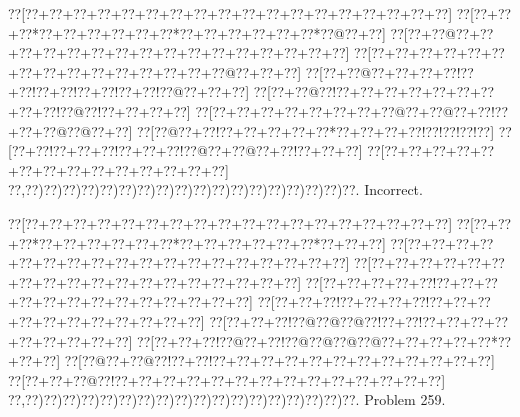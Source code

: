 \documentclass[a5paper]{article}
\begin{document}
\begin{center}
{\goo
\0??[\0??+\0??+\0??+\0??+\0??+\0??+\0??+\0??+\0??+\0??+\0??+\0??+\0??+\0??+\0??+\0??+\0??+\0??]
\0??[\0??+\0??+\0??*\0??+\0??+\0??+\0??+\0??+\0??*\0??+\0??+\0??+\0??+\0??+\0??*\0??@\0??+\0??]
\0??[\0??+\0??@\0??+\0??+\0??+\0??+\0??+\0??+\0??+\0??+\0??+\0??+\0??+\0??+\0??+\0??+\0??+\0??]
\0??[\0??+\0??+\0??+\0??+\0??+\0??+\0??+\0??+\0??+\0??+\0??+\0??+\0??+\0??+\0??@\0??+\0??+\0??]
\0??[\0??+\0??@\0??+\0??+\0??+\0??!\0??+\0??!\0??+\0??!\0??+\0??!\0??+\0??!\0??@\0??+\0??+\0??]
\0??[\0??+\0??@\0??!\0??+\0??+\0??+\0??+\0??+\0??+\0??+\0??+\0??!\0??@\0??!\0??+\0??+\0??+\0??]
\0??[\0??+\0??+\0??+\0??+\0??+\0??+\0??+\0??@\0??+\0??@\0??+\0??!\0??+\0??+\0??@\0??@\0??+\0??]
\0??[\0??@\0??+\0??!\0??+\0??+\0??+\0??+\0??*\0??+\0??+\0??+\0??!\0??!\0??!\0??!\0??]
\0??[\0??+\0??!\0??+\0??+\0??!\0??+\0??+\0??!\0??@\0??+\0??@\0??+\0??!\0??+\0??+\0??]
\0??[\0??+\0??+\0??+\0??+\0??+\0??+\0??+\0??+\0??+\0??+\0??+\0??+\0??+\0??]
\0??,\0??)\0??)\0??)\0??)\0??)\0??)\0??)\0??)\0??)\0??)\0??)\0??)\0??)\0??)\0??)\0??)\0??)\0??.
}
Incorrect. 

\end{center}
\newpage
\begin{center}
{\goo
\0??[\0??+\0??+\0??+\0??+\0??+\0??+\0??+\0??+\0??+\0??+\0??+\0??+\0??+\0??+\0??+\0??+\0??+\0??]
\0??[\0??+\0??+\0??*\0??+\0??+\0??+\0??+\0??+\0??*\0??+\0??+\0??+\0??+\0??+\0??*\0??+\0??+\0??]
\0??[\0??+\0??+\0??+\0??+\0??+\0??+\0??+\0??+\0??+\0??+\0??+\0??+\0??+\0??+\0??+\0??+\0??+\0??]
\0??[\0??+\0??+\0??+\0??+\0??+\0??+\0??+\0??+\0??+\0??+\0??+\0??+\0??+\0??+\0??+\0??+\0??+\0??]
\0??[\0??+\0??+\0??+\0??+\0??!\0??+\0??+\0??+\0??+\0??+\0??+\0??+\0??+\0??+\0??+\0??+\0??+\0??]
\0??[\0??+\0??+\0??!\0??+\0??+\0??+\0??!\0??+\0??+\0??+\0??+\0??+\0??+\0??+\0??+\0??+\0??+\0??]
\0??[\0??+\0??+\0??!\0??@\0??@\0??@\0??!\0??+\0??!\0??+\0??+\0??+\0??+\0??+\0??+\0??+\0??+\0??]
\0??[\0??+\0??+\0??!\0??@\0??+\0??!\0??@\0??@\0??@\0??@\0??+\0??+\0??+\0??+\0??*\0??+\0??+\0??]
\0??[\0??@\0??+\0??@\0??!\0??+\0??!\0??+\0??+\0??+\0??+\0??+\0??+\0??+\0??+\0??+\0??+\0??+\0??]
\0??[\0??+\0??+\0??@\0??!\0??+\0??+\0??+\0??+\0??+\0??+\0??+\0??+\0??+\0??+\0??+\0??+\0??+\0??]
\0??,\0??)\0??)\0??)\0??)\0??)\0??)\0??)\0??)\0??)\0??)\0??)\0??)\0??)\0??)\0??)\0??)\0??)\0??.
}
Problem 259.

\end{center}
\end{document}
